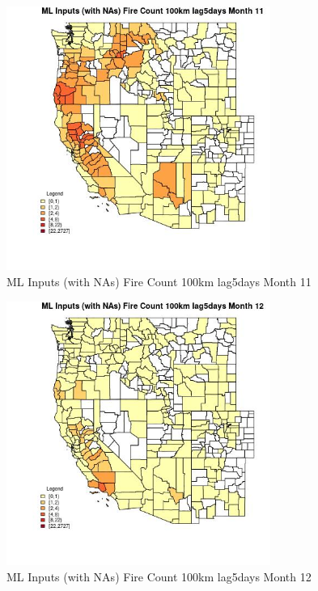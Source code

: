 \begin{figure} 
\centering  
\includegraphics[width=0.77\textwidth]{Code_Outputs/Report_ML_input_PM25_Step4_part_f_de_duplicated_aves_prioritize_24hr_obswNAs_CountyFire_Count_100km_lag5daysmedianMonth11.jpg} 
\caption{\label{fig:Report_ML_input_PM25_Step4_part_f_de_duplicated_aves_prioritize_24hr_obswNAsCountyFire_Count_100km_lag5daysmedianMonth11}ML Inputs (with NAs) Fire Count 100km lag5days Month 11} 
\end{figure} 
 

\begin{figure} 
\centering  
\includegraphics[width=0.77\textwidth]{Code_Outputs/Report_ML_input_PM25_Step4_part_f_de_duplicated_aves_prioritize_24hr_obswNAs_CountyFire_Count_100km_lag5daysmedianMonth12.jpg} 
\caption{\label{fig:Report_ML_input_PM25_Step4_part_f_de_duplicated_aves_prioritize_24hr_obswNAsCountyFire_Count_100km_lag5daysmedianMonth12}ML Inputs (with NAs) Fire Count 100km lag5days Month 12} 
\end{figure} 
 

